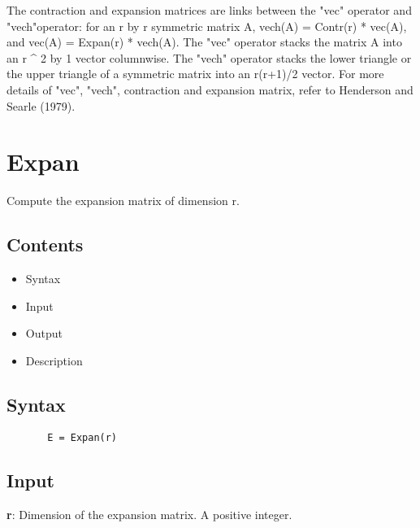 \documentclass[a4paper,11pt,openany]{memoir}
\begin{document}
\begin{par}
The contraction and expansion matrices are links between the "vec" operator and "vech"operator: for an r by r symmetric matrix A, vech(A) = Contr(r) * vec(A), and vec(A) = Expan(r) * vech(A). The "vec" operator stacks the matrix A into an r \^{} 2 by 1 vector columnwise.  The "vech" operator stacks the lower triangle or the upper triangle of a symmetric matrix into an r(r+1)/2 vector. For more details of "vec", "vech", contraction and expansion matrix, refer to Henderson and Searle (1979).
\end{par} \vspace{1em}

\newpage

\rmfamily
\color{black}\section{Expan}

\begin{par}
Compute the expansion matrix of dimension r.
\end{par} \vspace{1em}

\subsection*{Contents}

\begin{itemize}
\setlength{\itemsep}{-1ex}
   \item Syntax
   \item Input
   \item Output
   \item Description
\end{itemize}


\subsection*{Syntax}


\begin{verbatim}       E = Expan(r)\end{verbatim}
    

\subsection*{Input}

\begin{par}
\textbf{r}: Dimension of the expansion matrix.  A positive integer.
\end{par} \vspace{1em}
\end{document}

